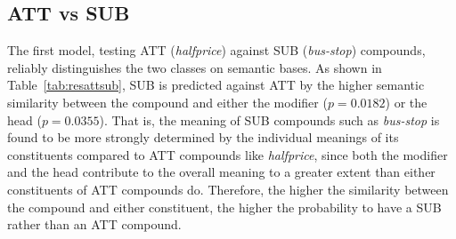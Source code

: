\documentclass[output=paper]{langsci/langscibook}
\begin{document}
\begin{table}[t]
\caption{Results of the logit model opposing ATT (1) to SUB (0).\label{tab:resattsub}}
\end{table}

\subsection{ATT vs SUB}

The first model, testing ATT (\emph{halfprice}) against SUB (\emph{bus-stop}) compounds, reliably distinguishes the two classes on semantic bases. As shown in Table~\ref{tab:resattsub}, SUB is predicted against ATT by the higher semantic similarity between the compound and either the modifier ($p=0.0182$) or the head ($p=0.0355$). That is, the meaning of SUB compounds such as \emph{bus-stop} is found to be more strongly determined by the individual meanings of its constituents compared to ATT compounds like \emph{halfprice}, since both the modifier and the head contribute to the overall meaning to a greater extent than either constituents of ATT compounds do. Therefore, the higher the similarity between the compound and either constituent, the higher the probability to have a SUB rather than an ATT compound.
\end{document}
